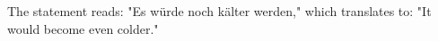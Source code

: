 The statement reads: "Es würde noch kälter werden," which translates to: "It would become even colder."